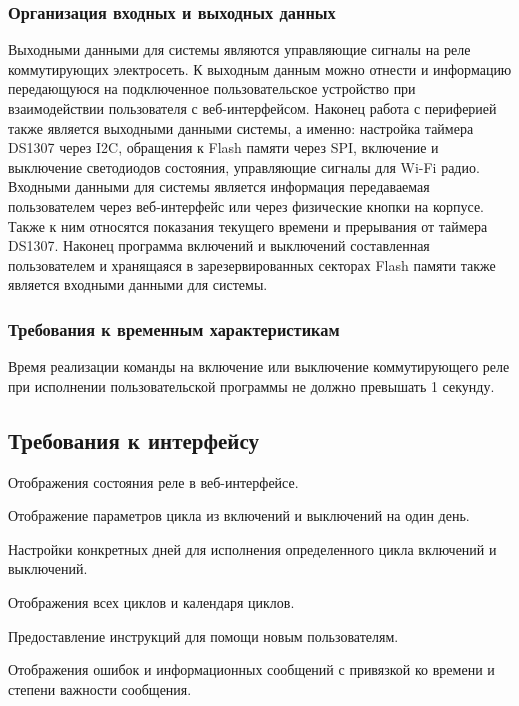 \subsubsection{Организация входных и выходных данных}
Выходными данными для системы являются управляющие сигналы на реле коммутирующих электросеть. К выходным данным можно отнести и информацию передающуюся на подключенное пользовательское устройство при взаимодействии пользователя с веб-интерфейсом. Наконец работа с периферией также является выходными данными системы, а именно: настройка таймера DS1307 через I2C, обращения к Flash памяти через SPI, включение и выключение светодиодов состояния, управляющие сигналы для Wi-Fi радио. Входными данными для системы является информация передаваемая пользователем через веб-интерфейс или через физические кнопки на корпусе. Также к ним относятся показания текущего времени и прерывания от таймера DS1307. Наконец программа включений и выключений составленная пользователем и хранящаяся в зарезервированных секторах Flash памяти также является входными данными для системы.

\subsubsection{Требования к временным характеристикам}
Время реализации команды на включение или выключение коммутирующего реле при исполнении пользовательской программы не должно превышать 1 секунду.


\subsection{Требования к интерфейсу}
\begin{my_enumerate}
\item Отображения состояния реле в веб-интерфейсе.
\item Отображение параметров цикла из включений и выключений на один день.
\item Настройки конкретных дней для исполнения определенного цикла включений и выключений.
\item Отображения всех циклов и календаря циклов.
\item Предоставление инструкций для помощи новым пользователям.
\item Отображения ошибок и информационных сообщений с привязкой ко времени и степени важности сообщения.
\end{my_enumerate}


